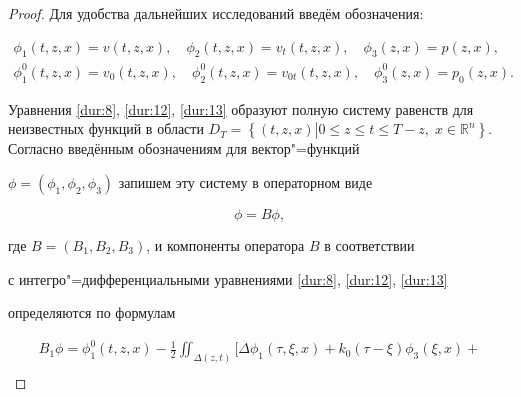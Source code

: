 \smallskip



\begin{proof}

 Для удобства дальнейших исследований введём обозначения:

\begin{gather*}

{\phi _1}(t, z, x)  = v(t, z, x) ,\quad  {\phi _2}(t, z, x)  = v_t (t, z, x) ,

\quad  {\phi _3}\left( {z,x} \right) = p\left( {z,x} \right),

\\

\phi _1^0(t,z,x) = {v_0}(t, z, x) ,\quad  \phi _2^0(t, z, x)  = {v_{0t}}(t, z, x) ,\quad 

\phi _3^0\left( {z,x} \right) = {p_0}\left( {z,x} \right).

\end{gather*}



 Уравнения  \eqref{dur:8}, \eqref{dur:12}, \eqref{dur:13} образуют полную систему равенств для неизвестных функций  в области ${D_T} = \left\{ {(t, z, x) \left|

  {0 \leqslant z \leqslant t \leqslant T - z, \;x \in {\mathbb R^n}} \right.} \right\}$. Согласно введённым обозначениям для вектор"=функций

   $\phi  = \left( {{\phi _1},{\phi _2},{\phi _3}} \right)$ запишем эту систему в операторном виде

\begin{equation}

\phi  = B\phi , 

\label{dur:14}

\end{equation}

где $B = \left( {{B_1},{B_2},{B_3}} \right)$, и компоненты оператора $B$ в соответствии

с интегро"=дифференциальными уравнениями \eqref{dur:8}, \eqref{dur:12}, \eqref{dur:13}

 определяются по формулам

\begin{multline*}

{B_1}\phi  = \phi _1^0(t, z, x)  - 

\frac 12 \iint_{\Delta (z,t)} \biggl[ \Delta {\phi _1}\left( {\tau ,\xi ,x} \right) + {k_0}(\tau  - \xi ){\phi _3}(\xi ,x) +

\\


\end{multline*}
\end{proof}
